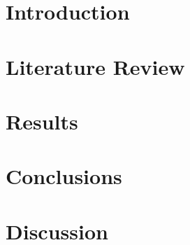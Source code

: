 \documentclass[fleqn]{cas-sc}
\begin{document}
\maketitle


\section{Introduction}\label{What does the label do?}

\begin{comment}
	Notes from 5/16/22 meeting with Dr. Jin:
		I Motivation - Good, needs more material
		II Analyze Difficulty in Solving Problem
		III ML/Data Analysis
			Tradeoffs
			Limits of Methods
		IV Plan
		
		Mention overlaps with other work
\end{comment}







\section{Literature Review}





















\section{Results}

\section{Conclusions}

\section{Discussion}
\end{document}
